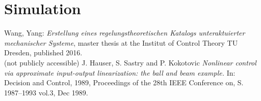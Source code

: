 \documentclass[10pt,a4paper]{article}
\begin{document}
	
\section{Simulation}
	\begin{thebibliography}{10}		
		Wang, Yang: 
		\textit{Erstellung eines regelungstheoretischen Katalogs unteraktuierter mechanischer Systeme}, master thesis at the Institut of Control Theory TU Dresden, published 2016. \\
		(not publicly accessible)
		J. Hauser, S. Sastry and P. Kokotovic 
		\textit{Nonlinear control via approximate input-output linearization: the ball and beam example.} In: Decision and Control, 1989, Proceedings of the 28th IEEE Conference on, S. 1987–1993 vol.3, Dec 1989.
	\end{thebibliography}
\end{document}
